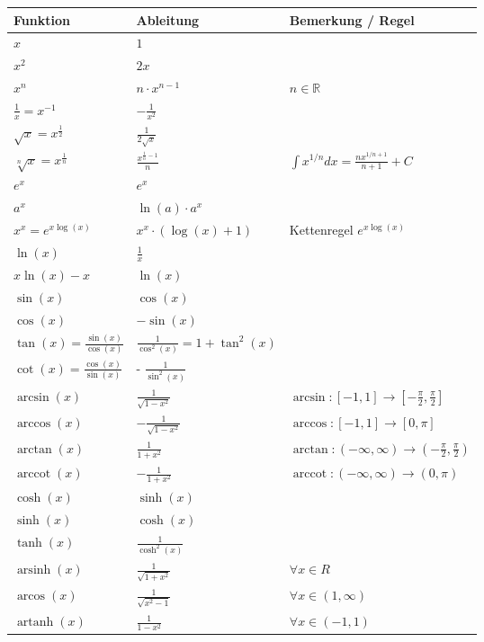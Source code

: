 \documentclass{sciposter}
\newcommand{\R}{\mathbb{R}}
\begin{document}
\begin{multicols}{2}
{\renewcommand{\arraystretch}{1.5}
	\begin{table}[]
		\begin{tabular}{@{} p{} p{} p{} @{}}
			\toprule
			Funktion & Ableitung & Bemerkung / Regel\\ \midrule
			$x$ & $1$ &   \\
			$x^2$& $2x$ &   \\
			$x^n$& $n\cdot x^{n-1}$ & $n \in \R$  \\
			$\frac{1}{x} = x^{-1}$ & $- \frac{1}{x^2}$ & \\
			$\sqrt{x} = x^{\frac{1}{2}}$ & $\frac{1}{2\sqrt{x}}$ & \\ 
			$\sqrt[n]{x} = x^{\frac{1}{n}}$ & $\frac{x^{\frac{1}{n} -1 }}{n}$ &  $\int x^{1/n} dx = \frac{n x^{1/n + 1}}{n+1} + C$\\ 
			$e^x$ & $e^x$ & \\
			$a^x$ & $\ln(a) \cdot a^x$& \\
			$x^x = e^{x\log(x)}$ & $x^x \cdot (\log(x) + 1)$ & Kettenregel $e^{x\log(x)}$\\
			$\ln(x)$ & $\frac{1}{x}$ & \\
			$x\ln(x) - x$ & $\ln(x)$ &  \\ \midrule
			$\sin(x)$ & $\cos(x)$ & \\
			$\cos(x)$ & $- \sin(x)$ & \\ 
			$\tan(x) = \frac{\sin(x)}{\cos(x)}$ & $\frac{1}{\cos^2(x)} = 1 + \tan^2(x)$ &\\
			$\cot(x) = \frac{\cos(x)}{\sin(x)}$ & - $\frac{1}{\sin^2(x)}$ & \\ 
			$\arcsin(x)$ & $\frac{1}{\sqrt{1 - x^2}}$ & $ \arcsin : [-1,1] \to [-\frac{\pi}{2},\frac{\pi}{2}]$\\
			$\arccos(x)$ & $ - \frac{1}{\sqrt{1-x^2}}$ & $\arccos : [-1,1] \to [0, \pi]$\\
			$\arctan(x)$ & $\frac{1}{1+x^2}$ & $\arctan:(-\infty, \infty) \to (- \frac{\pi}{2},\frac{\pi}{2})$\\
			$\operatorname{arccot}(x)$ & $ - \frac{1}{1+x^2} $ & $\operatorname{arccot} : (-\infty, \infty) \to (0,\pi)$\\
			\midrule
			$\cosh(x)$ & $\sinh(x)$ &\\
			$\sinh(x)$ & $\cosh(x)$ & \\
			$\tanh(x)$ & $\frac{1}{\cosh^2(x)}$ & \\
			$\operatorname{arsinh}(x)$ & $\frac{1}{\sqrt{1+x^2}}$ & $\forall x \in R$\\
			$\operatorname{arcos}(x)$ & $\frac{1}{\sqrt{x^2 - 1}}$ & $\forall x \in (1, \infty)$\\		  $\operatorname{artanh}(x)$ & $\frac{1}{1-x^2}$ & $\forall x \in (-1,1)$\\

\end{tabular}
\end{table}}
\end{multicols}
\end{document}
